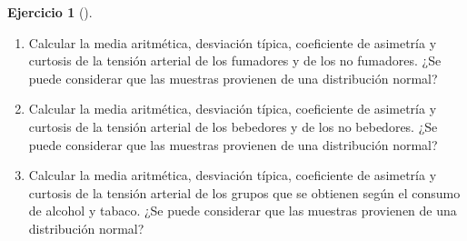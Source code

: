 \documentclass[
  spanish,
  a4paper,
]{scrreport}
\theoremstyle{definition}
\newtheorem{exercise}{Ejercicio}[chapter]
\theoremstyle{remark}
\begin{document}
\begin{exercise}[]
\begin{enumerate}
\def\labelenumi{\alph{enumi}.}
\item
  Calcular la media aritmética, desviación típica, coeficiente de
  asimetría y curtosis de la tensión arterial de los fumadores y de los
  no fumadores. ¿Se puede considerar que las muestras provienen de una
  distribución normal?
\item
  Calcular la media aritmética, desviación típica, coeficiente de
  asimetría y curtosis de la tensión arterial de los bebedores y de los
  no bebedores. ¿Se puede considerar que las muestras provienen de una
  distribución normal?
\item
  Calcular la media aritmética, desviación típica, coeficiente de
  asimetría y curtosis de la tensión arterial de los grupos que se
  obtienen según el consumo de alcohol y tabaco. ¿Se puede considerar
  que las muestras provienen de una distribución normal?
\end{enumerate}

\end{exercise}
\end{document}
